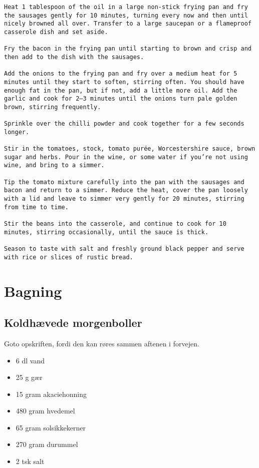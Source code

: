 \documentclass[
  letterpaper,
  DIV=11,
  numbers=noendperiod]{scrreprt}
\providecommand{\tightlist}{%
  \setlength{\itemsep}{0pt}\setlength{\parskip}{0pt}}\usepackage{longtable,booktabs,array}
\begin{document}
\begin{verbatim}
Heat 1 tablespoon of the oil in a large non-stick frying pan and fry the sausages gently for 10 minutes, turning every now and then until nicely browned all over. Transfer to a large saucepan or a flameproof casserole dish and set aside.

Fry the bacon in the frying pan until starting to brown and crisp and then add to the dish with the sausages.

Add the onions to the frying pan and fry over a medium heat for 5 minutes until they start to soften, stirring often. You should have enough fat in the pan, but if not, add a little more oil. Add the garlic and cook for 2–3 minutes until the onions turn pale golden brown, stirring frequently.

Sprinkle over the chilli powder and cook together for a few seconds longer.

Stir in the tomatoes, stock, tomato purée, Worcestershire sauce, brown sugar and herbs. Pour in the wine, or some water if you’re not using wine, and bring to a simmer.

Tip the tomato mixture carefully into the pan with the sausages and bacon and return to a simmer. Reduce the heat, cover the pan loosely with a lid and leave to simmer very gently for 20 minutes, stirring from time to time.

Stir the beans into the casserole, and continue to cook for 10 minutes, stirring occasionally, until the sauce is thick.

Season to taste with salt and freshly ground black pepper and serve with rice or slices of rustic bread.
\end{verbatim}


\hypertarget{bagning}{%
\chapter{Bagning}\label{bagning}}

\hypertarget{koldhuxe6vede-morgenboller}{%
\section{Koldhævede morgenboller}\label{koldhuxe6vede-morgenboller}}

Goto opskriften, fordi den kan røres sammen aftenen i forvejen.

\begin{itemize}
\tightlist
\item
  6 dl vand
\item
  25 g gær
\item
  15 gram akaciehonning
\item
  480 gram hvedemel
\item
  65 gram solsikkekerner
\item
  270 gram durummel
\item
  2 tsk salt
\end{itemize}
\end{document}
